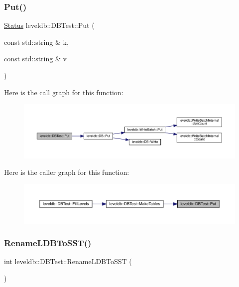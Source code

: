 \subsubsection{\texorpdfstring{Put()}{Put()}}
{\footnotesize\ttfamily \mbox{\hyperlink{classleveldb_1_1_status}{Status}} leveldb\+::\+D\+B\+Test\+::\+Put (\begin{DoxyParamCaption}\item[{const std\+::string \&}]{k,  }\item[{const std\+::string \&}]{v }\end{DoxyParamCaption})\hspace{0.3cm}{\ttfamily [inline]}}

Here is the call graph for this function\+:
\nopagebreak
\begin{figure}[H]
\begin{center}
\leavevmode
\includegraphics[width=350pt]{classleveldb_1_1_d_b_test_a5ec1a1d5ecc1744f325159eb81e46514_cgraph}
\end{center}
\end{figure}
Here is the caller graph for this function\+:
\nopagebreak
\begin{figure}[H]
\begin{center}
\leavevmode
\includegraphics[width=350pt]{classleveldb_1_1_d_b_test_a5ec1a1d5ecc1744f325159eb81e46514_icgraph}
\end{center}
\end{figure}
\mbox{\label{classleveldb_1_1_d_b_test_a104ae4b9292787d0cfc9a9fb93cc5fa8}} 
\subsubsection{\texorpdfstring{RenameLDBToSST()}{RenameLDBToSST()}}
{\footnotesize\ttfamily int leveldb\+::\+D\+B\+Test\+::\+Rename\+L\+D\+B\+To\+S\+ST (\begin{DoxyParamCaption}{ }\end{DoxyParamCaption})\hspace{0.3cm}{\ttfamily [inline]}}

